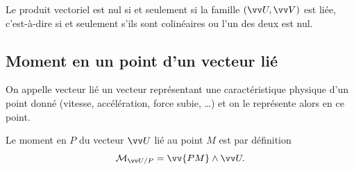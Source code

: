 Le produit vectoriel est nul si et seulement si la famille $(\vU,\vV)$ est liée, c'est-à-dire si et seulement s'ils sont colinéaires ou l'un des deux est nul.

\subsection{Moment en un point d'un vecteur lié}
\label{chap1-sec:momentenunpointdunvecteurlié}

On appelle vecteur lié un vecteur représentant une caractéristique physique d'un point donné (vitesse, accélération, force subie, \ldots) et on le représente alors en ce point.

Le moment en $P$ du vecteur $\vU$ lié au point $M$ est par définition
\begin{equation}
  \Mom{P}{\vU}=\vv{PM}\wedge\vU.
\end{equation}

